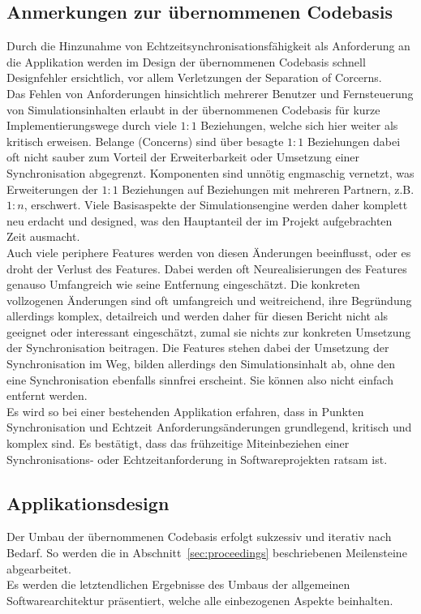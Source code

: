 \documentclass[11pt,twoside,a4paper]{article}
\begin{document}
\subsection{Anmerkungen zur übernommenen Codebasis}
Durch die Hinzunahme von Echtzeitsynchronisationsfähigkeit als Anforderung an die Applikation werden im Design der übernommenen Codebasis schnell Designfehler ersichtlich, vor allem Verletzungen der Separation of Corcerns.\\
Das Fehlen von Anforderungen hinsichtlich mehrerer Benutzer und Fernsteuerung von Simulationsinhalten erlaubt in der übernommenen Codebasis für kurze Implementierungswege durch viele $1:1$ Beziehungen, welche sich hier weiter als kritisch erweisen. Belange (Concerns) sind über besagte $1:1$ Beziehungen dabei oft nicht sauber zum Vorteil der Erweiterbarkeit oder Umsetzung einer Synchronisation abgegrenzt. Komponenten sind unnötig engmaschig vernetzt, was Erweiterungen der $1:1$ Beziehungen auf Beziehungen mit mehreren Partnern, z.B. $1:n$, erschwert. 
Viele Basisaspekte der Simulationsengine werden daher komplett neu erdacht und designed, was den Hauptanteil der im Projekt aufgebrachten Zeit ausmacht.\\
Auch viele periphere Features werden von diesen Änderungen beeinflusst, oder es droht der Verlust des Features. Dabei werden oft Neurealisierungen des Features genauso Umfangreich wie seine Entfernung eingeschätzt.
Die konkreten vollzogenen Änderungen sind oft umfangreich und weitreichend, ihre Begründung allerdings komplex, detailreich und werden daher für diesen Bericht nicht als geeignet oder interessant eingeschätzt, zumal sie nichts zur konkreten Umsetzung der Synchronisation beitragen. Die Features stehen dabei der Umsetzung der Synchronisation im Weg, bilden allerdings den Simulationsinhalt ab, ohne den eine Synchronisation ebenfalls sinnfrei erscheint. Sie können also nicht einfach entfernt werden.\\
Es wird so bei einer bestehenden Applikation erfahren, dass in Punkten Synchronisation und Echtzeit Anforderungsänderungen grundlegend, kritisch und komplex sind.
Es bestätigt, dass das frühzeitige Miteinbeziehen einer Synchronisations- oder Echtzeitanforderung in Softwareprojekten ratsam ist.

\subsection{Applikationsdesign}
Der Umbau der übernommenen Codebasis erfolgt sukzessiv und iterativ nach Bedarf. 
So werden die in Abschnitt~\ref{sec:proceedings} beschriebenen Meilensteine abgearbeitet.\\
Es werden die letztendlichen Ergebnisse des Umbaus der allgemeinen Softwarearchitektur präsentiert, welche alle einbezogenen Aspekte beinhalten.
\end{document}
